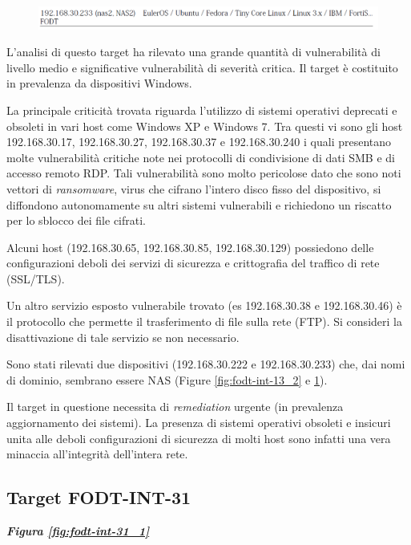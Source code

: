 \documentclass[target=bach,aauheader=]{thud}
\begin{document}
\begin{figure}[t]
    \centering
    \includegraphics[width=1\linewidth]{images/FODT-INT-13_3.png}
    \caption{}
    \label{fig:fodt-int-13_3}
\end{figure}

L’analisi di questo target ha rilevato una grande quantità di vulnerabilità di livello medio e significative vulnerabilità di severità critica. Il target è costituito in prevalenza da dispositivi Windows.

La principale criticità trovata riguarda l’utilizzo di sistemi operativi deprecati e obsoleti in vari host come Windows XP e Windows 7.
Tra questi vi sono gli host 192.168.30.17, 192.168.30.27, 192.168.30.37 e 192.168.30.240 i quali presentano molte vulnerabilità critiche note nei protocolli di condivisione di dati SMB e di accesso remoto RDP. Tali vulnerabilità sono molto pericolose dato che sono noti vettori di \textit{ransomware}, virus che cifrano l’intero disco fisso del dispositivo, si diffondono autonomamente su altri sistemi vulnerabili e richiedono un riscatto per lo sblocco dei file cifrati.

Alcuni host (192.168.30.65, 192.168.30.85, 192.168.30.129) possiedono delle configurazioni deboli dei servizi di sicurezza e crittografia del traffico di rete (SSL/TLS).

Un altro servizio esposto vulnerabile trovato (es 192.168.30.38 e 192.168.30.46) è il protocollo che permette il trasferimento di file sulla rete (FTP). Si consideri la disattivazione di tale servizio se non necessario.

Sono stati rilevati due dispositivi (192.168.30.222 e 192.168.30.233) che, dai nomi di dominio, sembrano essere NAS (Figure \ref{fig:fodt-int-13_2} e \ref{fig:fodt-int-13_3}).

Il target in questione necessita di \textit{remediation} urgente (in prevalenza aggiornamento dei sistemi). La presenza di sistemi operativi obsoleti e insicuri unita alle deboli configurazioni di sicurezza di molti host sono infatti una vera minaccia all’integrità dell’intera rete.

\subsection{Target FODT-INT-31} \textbf{\textit{Figura \ref{fig:fodt-int-31_1}}}
\end{document}
